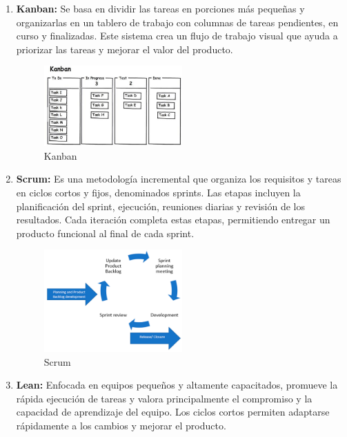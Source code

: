 \begin{enumerate}
    \item \textbf{Kanban:} Se basa en dividir las tareas en porciones más pequeñas y organizarlas en un tablero de trabajo con columnas de tareas pendientes, en curso y finalizadas. Este sistema crea un flujo de trabajo visual que ayuda a priorizar las tareas y mejorar el valor del producto.

          \begin{figure}[H]
              \centering
              \includegraphics[width=0.5\textwidth]{imagenes/Kanban.png}
              \caption{Kanban \cite{kanban_img}}
              \label{fig:kanban}
          \end{figure}

    \item \textbf{Scrum:} Es una metodología incremental que organiza los requisitos y tareas en ciclos cortos y fijos, denominados sprints. Las etapas incluyen la planificación del sprint, ejecución, reuniones diarias y revisión de los resultados. Cada iteración completa estas etapas, permitiendo entregar un producto funcional al final de cada sprint.

          \begin{figure}[H]
              \centering
              \includegraphics[width=0.5\textwidth]{imagenes/Scrum.jpg}
              \caption{Scrum \cite{scrum_img}}
              \label{fig:scrum}
          \end{figure}

    \item \textbf{Lean:} Enfocada en equipos pequeños y altamente capacitados, promueve la rápida ejecución de tareas y valora principalmente el compromiso y la capacidad de aprendizaje del equipo. Los ciclos cortos permiten adaptarse rápidamente a los cambios y mejorar el producto.


\end{enumerate}
